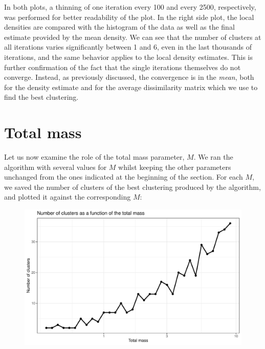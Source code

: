 In both plots, a thinning of one iteration every 100 and every 2500, respectively, was performed for better readability of the plot.
In the right side plot, the local densities are compared with the histogram of the data as well as the final estimate provided by the mean density.
We can see that the number of clusters at all iterations varies significantly between 1 and 6, even in the last thousands of iterations, and the same behavior applies to the local density estimates. 
This is further confirmation of the fact that the single iterations themselves do not converge.
Instead, as previously discussed, the convergence is in the \emph{mean}, both for the density estimate and for the average dissimilarity matrix which we use to find the best clustering.

\section{Total mass}
Let us now examine the role of the total mass parameter, $M$.
We ran the algorithm with several values for $M$ whilst keeping the other parameters unchanged from the ones indicated at the beginning of the section.
For each $M$, we saved the number of clusters of the best clustering produced by the algorithm, and plotted it against the corresponding $M$:
\begin{figure}[h]
	\centering
	\includegraphics[scale=0.6]{etc/num_clust_M.pdf}
\end{figure}

